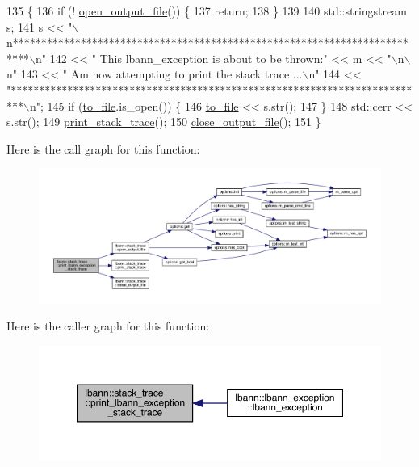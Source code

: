 \begin{DoxyCode}
135                                                     \{
136   \textcolor{keywordflow}{if} (! \hyperlink{namespacelbann_1_1stack__trace_aa071d75a81128e2a8100d66529482842}{open\_output\_file}()) \{
137     \textcolor{keywordflow}{return};
138   \}
139   
140   std::stringstream s;
141   s << \textcolor{stringliteral}{"\(\backslash\)n**************************************************************************\(\backslash\)n"}
142     << \textcolor{stringliteral}{" This lbann\_exception is about to be thrown:"} << m << \textcolor{stringliteral}{"\(\backslash\)n\(\backslash\)n"}
143     << \textcolor{stringliteral}{" Am now attempting to print the stack trace ...\(\backslash\)n"}
144     << \textcolor{stringliteral}{"**************************************************************************\(\backslash\)n"};
145   \textcolor{keywordflow}{if} (\hyperlink{namespacelbann_1_1stack__trace_a6c838c74fec7cc57e5ccad283a8d282b}{to\_file}.is\_open()) \{
146     \hyperlink{namespacelbann_1_1stack__trace_a6c838c74fec7cc57e5ccad283a8d282b}{to\_file} << s.str();
147   \}
148   std::cerr << s.str();
149   \hyperlink{namespacelbann_1_1stack__trace_a52adbb11fce7541e2bc34b712d09e868}{print\_stack\_trace}();
150   \hyperlink{namespacelbann_1_1stack__trace_a45e4398bd4d0a7b9956107192a342b89}{close\_output\_file}();
151 \}
\end{DoxyCode}
Here is the call graph for this function\+:\nopagebreak
\begin{figure}[H]
\begin{center}
\leavevmode
\includegraphics[width=350pt]{namespacelbann_1_1stack__trace_ae7396b3b0ee5d087a045f04ce690cae4_cgraph}
\end{center}
\end{figure}
Here is the caller graph for this function\+:\nopagebreak
\begin{figure}[H]
\begin{center}
\leavevmode
\includegraphics[width=350pt]{namespacelbann_1_1stack__trace_ae7396b3b0ee5d087a045f04ce690cae4_icgraph}
\end{center}
\end{figure}
